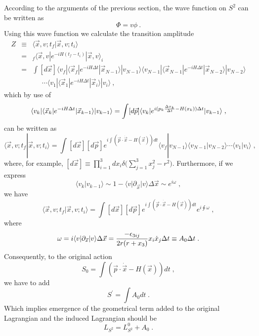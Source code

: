 \documentclass[12pt,a4paper]{article}
\begin{document}
According to the arguments of the previous section, the wave function on $%
S^{2}$ can be written as 
\begin{equation}
\Phi =v\phi \ .
\end{equation}
Using this wave function we calculate the transition amplitude 
\begin{eqnarray}
Z &\equiv &\langle \vec{x},v;t_{f}|\vec{x},v;t_{i}\rangle  \nonumber \\
&=&{}_{f}\langle \vec{x},v|e^{-iH(t_{f}-t_{i})}|\vec{x},v\rangle _{i} 
\nonumber \\
&=&\int [d\vec{x}]\langle v_{f}|\langle \vec{x}_{f}|e^{-iH\Delta t}|\vec{x}%
_{N-1}\rangle |v_{N-1}\rangle \langle v_{N-1}|\langle \vec{x}%
_{N-1}|e^{-iH\Delta t}|\vec{x}_{N-2}\rangle |v_{N-2}\rangle  \nonumber \\
&&\;\;\;\;\;\cdots \langle v_{1}|\langle \vec{x}_{1}|e^{-iH\Delta t}|\vec{x}%
_{i}\rangle |v_{i}\rangle \ ,
\end{eqnarray}
which by use of 
\begin{equation}
\langle v_{k}|\langle \vec{x}_{k}|e^{-iH\Delta t}|\vec{x}_{k-1}\rangle
|v_{k-1}\rangle =\int [d\vec{p}]\langle v_{k}|e^{i(p_{k}\frac{\Delta x_{k}}{%
\Delta t}-H(x_{k}))\Delta t}|v_{k-1}\rangle \;,
\end{equation}
can be written as 
\begin{equation}
\langle \vec{x},v;t_{f}|\vec{x},v;t_{i}\rangle =\int [d\vec{x}][d\vec{p}%
]e^{i\int (\vec{p}\cdot \dot{\vec{x}}-H(\vec{x}))dt}\langle
v_{f}|v_{N-1}\rangle \langle v_{N-1}|v_{N-2}\rangle \cdots \langle
v_{1}|v_{i}\rangle \;,
\end{equation}
where, for example, $[d\vec{x}]\equiv \displaystyle{\prod_{i=1}^{3}dx_{i}%
\delta (\sum_{j=1}^{3}x_{j}^{2}-}r^{2}{)}$. Furthermore, if we express 
\begin{equation}
\langle v_{k}|v_{k-1}\rangle \sim 1-\langle v|\partial _{\vec{x}}|v\rangle
\Delta \vec{x}\sim e^{i\omega }\;,  \nonumber
\end{equation}
we have 
\begin{equation}
\langle \vec{x},v;t_{f}|\vec{x},v;t_{i}\rangle =\int [d\vec{x}][d\vec{p}%
]e^{i\int (\vec{p}\cdot \dot{\vec{x}}-H(\vec{x}))dt}e^{i\oint \omega }\;,
\end{equation}
where 
\begin{equation}
\omega =i\langle v|\partial _{\vec{x}}|v\rangle \Delta \vec{x}={\frac{%
-\epsilon _{3ij}}{2r(r+x_{3})}}x_{i}\dot{x}_{j}\Delta t\equiv A_{0}\Delta
t\;.  \nonumber
\end{equation}
Consequently, to the original action 
\begin{equation}
S_{0}=\int (\vec{p}\cdot \dot{\vec{x}}-H(\vec{x}))dt\;,
\end{equation}
we have to add 
\begin{equation}
S^{\prime }={\int }A_{0}dt\;.
\end{equation}
Which implies emergence of the geometrical term added to the original
Lagrangian and the induced Lagrangian should be 
\begin{equation}
L_{S^{2}}=L_{S^{2}}^{0}+A_{0}\;.  \label{LS2}
\end{equation}
\end{document}
